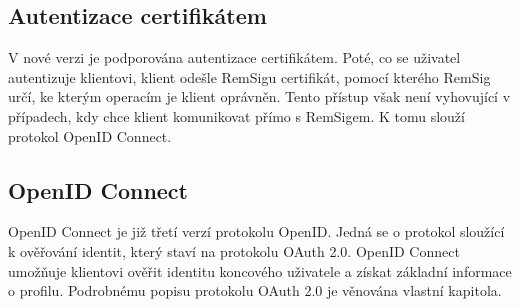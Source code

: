 \documentclass[]{fithesis3}
\begin{document}
		\subsection{Autentizace certifikátem}

		V nové verzi je podporována autentizace certifikátem. Poté, co se uživatel autentizuje 				klientovi, klient odešle RemSigu certifikát, pomocí kterého RemSig určí, ke kterým 				operacím je klient oprávněn. Tento přístup však není vyhovující v případech, kdy chce 			klient komunikovat přímo s RemSigem. K tomu slouží protokol OpenID Connect.

		\subsection{OpenID Connect}

		OpenID Connect je již třetí verzí protokolu OpenID. Jedná se o protokol sloužící k 					ověřování identit, který staví na protokolu OAuth 2.0.  OpenID Connect umožňuje 				klientovi ověřit identitu koncového uživatele a získat základní informace o profilu. 					Podrobnému popisu protokolu OAuth 2.0 je věnována vlastní kapitola.
\end{document}
